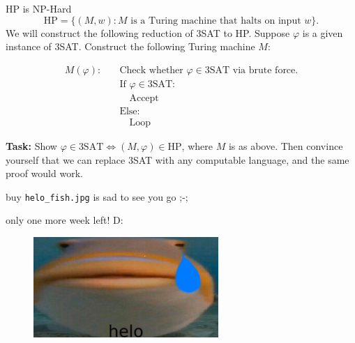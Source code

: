 \documentclass{beamer}
\begin{document}
\begin{frame}{HP is NP-Hard}
$$\text{HP} = \{(M, w): \text{$M$ is a Turing machine that halts on input $w$}\}.$$
We will construct the following reduction of 3SAT to HP. Suppose $\varphi$ is a given instance of 3SAT. Construct the following Turing machine $M$:

\begin{align*}
M(\varphi): \quad &\text{Check whether $\varphi \in \text{3SAT}$ via brute force.}\\
&\text{If $\varphi \in \text{3SAT}$:}\\
&\quad \text{Accept}\\
&\text{Else:}\\
&\quad \text{Loop}
\end{align*}

\textbf{Task:} Show $\varphi \in \text{3SAT} \Leftrightarrow (M, \varphi) \in \text{HP}$, where $M$ is as above. Then convince yourself that we can replace 3SAT with any computable language, and the same proof would work.

\end{frame}




\begin{frame}{buy}
\texttt{helo\_fish.jpg} is sad to see you go ;-; 

only one more week left! D:

\begin{figure}[h]
\centering
\includegraphics[width=7cm]{img/helo_fish_sad.jpg}
\end{figure}
\end{frame}
\end{document}
